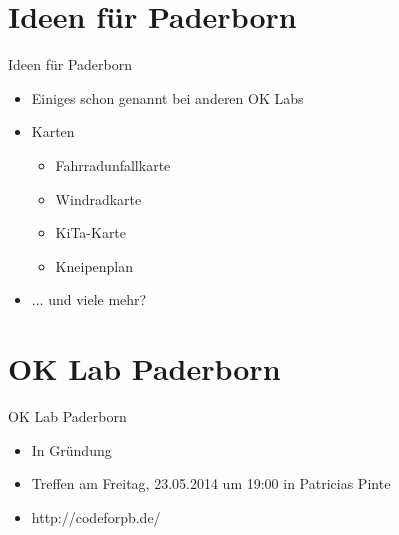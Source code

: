 \section{Ideen für Paderborn}

\begin{frame}{Ideen für Paderborn}
 \begin{itemize}
  \item Einiges schon genannt bei anderen OK Labs
  \item Karten
  \begin{itemize}
   \item Fahrradunfallkarte
   \item Windradkarte
   \item KiTa-Karte
   \item Kneipenplan
  \end{itemize}
  \item $\dots$ und viele mehr?
 \end{itemize}
\end{frame}

\section{OK Lab Paderborn}
\begin{frame}{OK Lab Paderborn}
 \begin{itemize}
  \item In Gründung
  \item Treffen am Freitag, 23.05.2014 um 19:00 in Patricias Pinte
  \item http://codeforpb.de/
 \end{itemize}
\end{frame}
